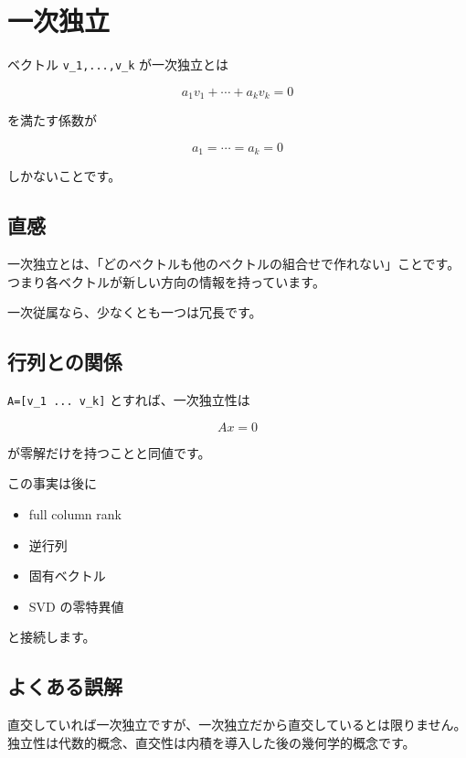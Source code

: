 \documentclass[
  11pt,
  a4paper,
]{ltjsarticle}
\author{}
\date{}
\providecommand{\tightlist}{%
  \setlength{\itemsep}{0pt}\setlength{\parskip}{0pt}}
\begin{document}
\hypertarget{ux4e00ux6b21ux72ecux7acb}{%
\section{一次独立}\label{ux4e00ux6b21ux72ecux7acb}}

ベクトル \texttt{v\_1,...,v\_k} が一次独立とは

\[
a_1v_1+\cdots+a_kv_k=0
\]

を満たす係数が

\[
a_1=\cdots=a_k=0
\]

しかないことです。

\hypertarget{ux76f4ux611f}{%
\subsection{直感}\label{ux76f4ux611f}}

一次独立とは、「どのベクトルも他のベクトルの組合せで作れない」ことです。つまり各ベクトルが新しい方向の情報を持っています。

一次従属なら、少なくとも一つは冗長です。

\hypertarget{ux884cux5217ux3068ux306eux95a2ux4fc2}{%
\subsection{行列との関係}\label{ux884cux5217ux3068ux306eux95a2ux4fc2}}

\texttt{A={[}v\_1\ ...\ v\_k{]}} とすれば、一次独立性は

\[
Ax=0
\]

が零解だけを持つことと同値です。

この事実は後に

\begin{itemize}
\tightlist
\item
  full column rank
\item
  逆行列
\item
  固有ベクトル
\item
  SVD の零特異値
\end{itemize}

と接続します。

\hypertarget{ux3088ux304fux3042ux308bux8aa4ux89e3}{%
\subsection{よくある誤解}\label{ux3088ux304fux3042ux308bux8aa4ux89e3}}

直交していれば一次独立ですが、一次独立だから直交しているとは限りません。独立性は代数的概念、直交性は内積を導入した後の幾何学的概念です。
\end{document}
